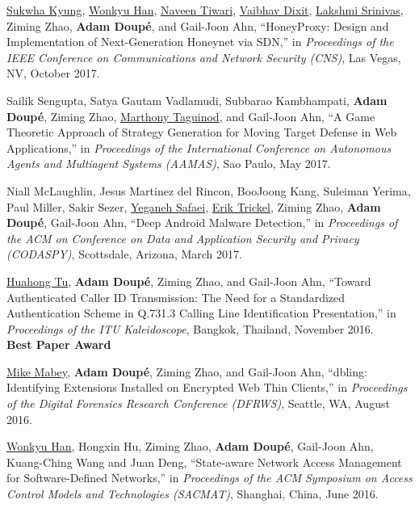 \documentclass[11pt,letterpaper,sans]{moderncv}
\begin{document}
\begin{etaremune}
\item \underline{Sukwha Kyung}, \underline{Wonkyu Han},
  \underline{Naveen Tiwari}, \underline{Vaibhav Dixit},
  \underline{Lakshmi Srinivas}, Ziming Zhao, \textbf{Adam Doup\'e}, and
  Gail-Joon Ahn, ``HoneyProxy: Design and Implementation of
  Next-Generation Honeynet via SDN,'' in \emph{Proceedings of the IEEE
    Conference on Communications and Network Security (CNS)}, Las
  Vegas, NV, October 2017. 

\item Sailik Sengupta, Satya Gautam Vadlamudi, Subbarao Kambhampati,
  \textbf{Adam Doup\'e}, Ziming Zhao, \underline{Marthony Taguinod},
  and Gail-Joon Ahn, ``A Game Theoretic Approach of Strategy
  Generation for Moving Target Defense in Web Applications,'' in
  \emph{Proceedings of the International Conference on Autonomous Agents
    and Multiagent Systems (AAMAS)}, Sao Paulo, May 2017.

\item Niall McLaughlin, Jesus Martinez del Rincon, BooJoong Kang,
  Suleiman Yerima, Paul Miller, Sakir Sezer, \underline{Yeganeh
    Safaei}, \underline{Erik Trickel}, Ziming Zhao, \textbf{Adam
    Doup\'e}, Gail-Joon Ahn, ``Deep Android Malware Detection,'' in
  \emph{Proceedings of the ACM on Conference on Data and Application
    Security and Privacy (CODASPY)}, Scottsdale, Arizona, March 2017.

\item \underline{Huahong Tu}, \textbf{Adam Doup\'e}, Ziming Zhao, and
  Gail-Joon Ahn, ``Toward Authenticated Caller ID Transmission: The
  Need for a Standardized Authentication Scheme in Q.731.3 Calling
  Line Identification Presentation,'' in \emph{Proceedings of the ITU
    Kaleidoscope}, Bangkok, Thailand, November 2016. \\
  \textbf{Best Paper Award}

\item \underline{Mike Mabey}, \textbf{Adam Doup\'e}, Ziming Zhao, and
  Gail-Joon Ahn, ``dbling: Identifying Extensions Installed on
  Encrypted Web Thin Clients,'' in \emph{Proceedings of the Digital
    Forensics Research Conference (DFRWS)}, Seattle, WA, August 2016.

\item \underline{Wonkyu Han}, Hongxin Hu, Ziming Zhao, \textbf{Adam
  Doup\'e}, Gail-Joon Ahn, Kuang-Ching Wang and Juan Deng,
  ``State-aware Network Access Management for Software-Defined
  Networks,'' in \emph{Proceedings of the ACM Symposium on Access
    Control Models and Technologies (SACMAT)}, Shanghai, China, June
  2016.


\end{etaremune}
\end{document}
